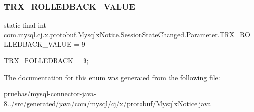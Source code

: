 \subsubsection{\texorpdfstring{T\+R\+X\+\_\+\+R\+O\+L\+L\+E\+D\+B\+A\+C\+K\+\_\+\+V\+A\+L\+UE}{TRX\_ROLLEDBACK\_VALUE}}
{\footnotesize\ttfamily  static  final int com.\+mysql.\+cj.\+x.\+protobuf.\+Mysqlx\+Notice.\+Session\+State\+Changed.\+Parameter.\+T\+R\+X\+\_\+\+R\+O\+L\+L\+E\+D\+B\+A\+C\+K\+\_\+\+V\+A\+L\+UE = 9\hspace{0.3cm}{\ttfamily [static]}}

{\ttfamily T\+R\+X\+\_\+\+R\+O\+L\+L\+E\+D\+B\+A\+CK = 9;} 

The documentation for this enum was generated from the following file\+:\begin{DoxyCompactItemize}
\item 
pruebas/mysql-\/connector-\/java-\/8../src/generated/java/com/mysql/cj/x/protobuf/Mysqlx\+Notice.\+java\end{DoxyCompactItemize}
